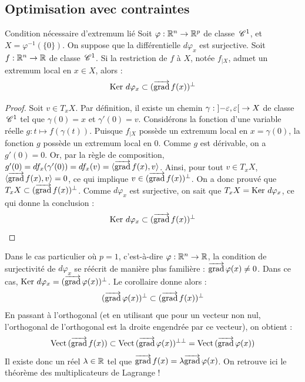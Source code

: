 \subsection{Optimisation avec contraintes}

\begin{corollaire}{Condition nécessaire d'extremum lié}{}
    Soit $\varphi : \mathbb{R}^n \to \mathbb{R}^p$ de classe $\,\mathscr C^{1}$, et $X = \varphi^{-1}(\{0\})$. On suppose que la différentielle $d\varphi_x$ est surjective.
    Soit $f : \mathbb{R}^n \to \mathbb{R}$ de classe $\,\mathscr C^{1}$.
    Si la restriction de $f$ à $X$, notée $f_{|X}$, admet un extremum local en $x \in X$, alors :
    \[ \operatorname{Ker} \, d\varphi_x \subset (\overrightarrow{\operatorname{grad}} \, f(x))^\perp \]
\end{corollaire}

\begin{proof}
    Soit $v \in T_x X$. Par définition, il existe un chemin $\gamma : \left]-\varepsilon, \varepsilon\right[ \to X$ de classe $\,\mathscr C^{1}$ tel que $\gamma(0)=x$ et $\gamma'(0)=v$.
    Considérons la fonction d'une variable réelle $g : t \mapsto f(\gamma(t))$. Puisque $f_{|X}$ possède un extremum local en $x = \gamma(0)$, la fonction $g$ possède un extremum local en $0$.
    Comme $g$ est dérivable, on a $g'(0) = 0$.
    Or, par la règle de composition, $g'(0) = df_x(\gamma'(0)) = df_x(v) = \langle \overrightarrow{\operatorname{grad}} \, f(x), v \rangle$.
    Ainsi, pour tout $v \in T_x X$, $\langle \overrightarrow{\operatorname{grad}} \, f(x), v \rangle = 0$, ce qui implique $v \in (\overrightarrow{\operatorname{grad}} \, f(x))^\perp$.
    On a donc prouvé que $T_x X \subset (\overrightarrow{\operatorname{grad}} \, f(x))^\perp$.
    Comme $d\varphi_x$ est surjective, on sait que $T_x X = \operatorname{Ker} \, d\varphi_x$, ce qui donne la conclusion :
    \[ \operatorname{Ker} \, d\varphi_x \subset (\overrightarrow{\operatorname{grad}} \, f(x))^\perp \]
\end{proof}

\begin{remarque}
    Dans le cas particulier où $p=1$, c'est-à-dire $\varphi : \mathbb{R}^n \to \mathbb{R}$, la condition de surjectivité de $d\varphi_x$ se réécrit de manière plus familière : $\overrightarrow{\operatorname{grad}} \, \varphi(x) \neq 0$.
    Dans ce cas, $\operatorname{Ker} \, d\varphi_x = (\overrightarrow{\operatorname{grad}} \, \varphi(x))^\perp$.
    Le corollaire donne alors :
    \[ (\overrightarrow{\operatorname{grad}} \, \varphi(x))^\perp \subset (\overrightarrow{\operatorname{grad}} \, f(x))^\perp \]
    En passant à l'orthogonal (et en utilisant que pour un vecteur non nul, l'orthogonal de l'orthogonal est la droite engendrée par ce vecteur), on obtient :
    \[ \operatorname{Vect} \,(\overrightarrow{\operatorname{grad}} \, f(x)) \subset \operatorname{Vect} \,(\overrightarrow{\operatorname{grad}} \, \varphi(x))^{\perp\perp} = \operatorname{Vect} \,(\overrightarrow{\operatorname{grad}} \, \varphi(x)) \]
    Il existe donc un réel $\lambda \in \mathbb{R}$ tel que $\overrightarrow{\operatorname{grad}} \, f(x) = \lambda \overrightarrow{\operatorname{grad}} \, \varphi(x)$. On retrouve ici le théorème des multiplicateurs de Lagrange !
\end{remarque}

